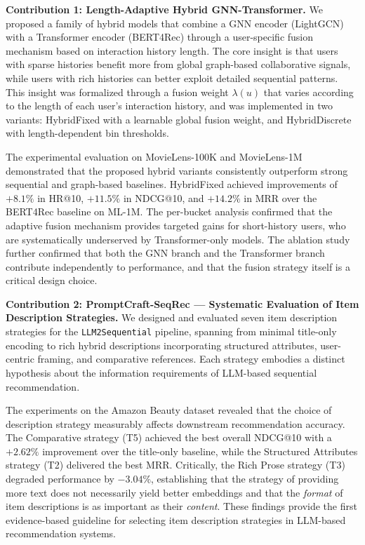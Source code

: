\documentclass[12pt,a4paper]{report}
\begin{document}
\textbf{Contribution 1: Length-Adaptive Hybrid GNN-Transformer.}
We proposed a family of hybrid models that combine a GNN encoder (LightGCN)
with a Transformer encoder (BERT4Rec) through a user-specific fusion mechanism
based on interaction history length. The core insight is that users with sparse
histories benefit more from global graph-based collaborative signals, while
users with rich histories can better exploit detailed sequential patterns. This
insight was formalized through a fusion weight \(\lambda(u)\) that varies
according to the length of each user's interaction history, and was implemented
in two variants: HybridFixed with a learnable global fusion weight, and
HybridDiscrete with length-dependent bin thresholds.

The experimental evaluation on MovieLens-100K and MovieLens-1M demonstrated
that the proposed hybrid variants consistently outperform strong sequential and
graph-based baselines. HybridFixed achieved improvements of \(+8.1\%\) in
HR@10, \(+11.5\%\) in NDCG@10, and \(+14.2\%\) in MRR over the BERT4Rec
baseline on ML-1M. The per-bucket analysis confirmed that the adaptive fusion
mechanism provides targeted gains for short-history users, who are
systematically underserved by Transformer-only models. The ablation study
further confirmed that both the GNN branch and the Transformer branch
contribute independently to performance, and that the fusion strategy itself is
a critical design choice.

\textbf{Contribution 2: PromptCraft-SeqRec — Systematic Evaluation of Item
Description Strategies.} We designed and evaluated seven item description
strategies for the \texttt{LLM2Sequential} pipeline, spanning from minimal
title-only encoding to rich hybrid descriptions incorporating structured
attributes, user-centric framing, and comparative references. Each strategy
embodies a distinct hypothesis about the information requirements of LLM-based
sequential recommendation.

The experiments on the Amazon Beauty dataset revealed that the choice of
description strategy measurably affects downstream recommendation accuracy.
The Comparative strategy (T5) achieved the best overall NDCG@10 with a
\(+2.62\%\) improvement over the title-only baseline, while the Structured
Attributes strategy (T2) delivered the best MRR. Critically, the Rich Prose
strategy (T3) degraded performance by \(-3.04\%\), establishing that the
strategy of providing more text does not necessarily yield better embeddings
and that the \emph{format} of item descriptions is as important as their
\emph{content}. These findings provide the first evidence-based guideline for
selecting item description strategies in LLM-based recommendation systems.
\end{document}

